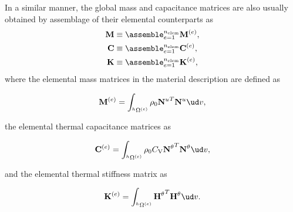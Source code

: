 In a similar manner, the global mass and capacitance matrices are also usually obtained by assemblage of their elemental counterparts as
\begin{align}
  \mathbf M &\equiv \assemble_{e=1}^{n_\text{elem}} \mathbf M^{(e)},\\
  \mathbf C &\equiv \assemble_{e=1}^{n_\text{elem}} \mathbf C^{(e)},\\
  \mathbf K &\equiv \assemble_{e=1}^{n_\text{elem}} \mathbf K^{(e)},
\end{align}
where the elemental mass matrices in the material description are defined as
\begin{highlight}
  \begin{equation}
    \mathbf M^{(e)} = \int_{^h\Omega^{(e)}} \rho_0 {\mathbf N^u}^T\mathbf N^u\ud v,
  \end{equation}
\end{highlight}
the elemental thermal capacitance matrices as
\begin{highlight}
  \begin{equation}
    \mathbf C^{(e)} = \int_{^h\Omega^{(e)}} \rho_0 C_\mathrm{V} {\mathbf N^\theta}^T\mathbf N^\theta\ud v,
  \end{equation}
\end{highlight}
and the elemental thermal stiffness matrix as
\begin{highlight}
\begin{equation}
\mathbf K^{(e)} = \int_{^h\Omega^{(e)}} {\mathbf H^{\theta}}^T\mathbf H^{\theta}\ud v.
\end{equation}
\end{highlight}

\newpage\null\thispagestyle{blank}\newpage

